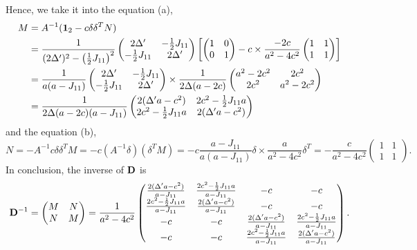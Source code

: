 \documentclass[a4paper]{book}
\newcounter{solution}[chapter]
\newcommand{\D}{{\bf D}}
\newcommand{\I}{{\bf 1}}
\begin{document}
\begin{solution}
\begin{itemize}
	Hence, we take it into the equation (a),
	\begin{align*}
		M &= A^{-1} ( \I_2 - c \delta \delta^T N) \\
		  &= \frac{1}{ (2\Delta^\prime)^2 - \left( \frac{1}{2} J_{11} \right)^2 } \begin{pmatrix}
		  	2\Delta^\prime & - \frac{1}{2} J_{11} \\ - \frac{1}{2} J_{11} & 2\Delta^\prime \end{pmatrix} \left[ \begin{pmatrix}
		  	1 & 0 \\ 0 & 1 
		 \end{pmatrix} - c \times \frac{ -2c }{ a^2 - 4c^2 } \begin{pmatrix} 1 & 1 \\ 1 & 1 	\end{pmatrix}  \right] \\
		 &= \frac{1}{ a ( a - J_{11} ) } \begin{pmatrix}
		  	2\Delta^\prime & - \frac{1}{2} J_{11} \\ - \frac{1}{2} J_{11} & 2\Delta^\prime \end{pmatrix} \times \frac{1}{ 2 \Delta ( a - 2c ) } \begin{pmatrix}
		a^2 - 2c^2 & 2c^2 \\ 2c^2 & a^2 - 2c^2 				  	
		  	\end{pmatrix} \\
		  &= \frac{1}{ 2\Delta (a-2c) (a-J_{11}) } \begin{pmatrix}
	2(\Delta^\prime a - c^2) & 2c^2 - \frac{1}{2} J_{11} a \\
	2c^2 - \frac{1}{2} J_{11} a & 2(\Delta^\prime a - c^2)
		  \end{pmatrix}
	\end{align*}
	and the equation (b),
	\[
		N = -A^{-1} c \delta \delta^T M = - c ( A^{-1} \delta ) (\delta^T M) = - c \frac{ a - J_{11} }{ a( a - J_{11} ) } \delta \times \frac{ a }{ a^2 - 4c^2 } \delta^T = - \frac{ c }{ a^2 - 4c^2 } \begin{pmatrix}
		  	 1 & 1 \\ 1 & 1
		  \end{pmatrix} .
	\]
	In conclusion, the inverse of $\D$ is
	\[
		\D^{-1} = \begin{pmatrix}
			M & N \\ N & M 
		\end{pmatrix} = \frac{ 1 }{ a^2 - 4c^2 } \begin{pmatrix}
			\frac{ 2(\Delta^\prime a - c^2) }{ a - J_{11} } & \frac{ 2c^2 - \frac{1}{2} J_{11} a }{ a - J_{11} } & -c & -c \\
			\frac{ 2c^2 - \frac{1}{2} J_{11} a }{ a - J_{11} } & \frac{ 2(\Delta^\prime a - c^2) }{ a - J_{11} } & -c & -c \\
			-c & -c & \frac{ 2(\Delta^\prime a - c^2) }{ a - J_{11} } & \frac{ 2c^2 - \frac{1}{2} J_{11} a }{ a - J_{11} } \\
			-c & -c & \frac{ 2c^2 - \frac{1}{2} J_{11} a }{ a - J_{11} } & \frac{ 2(\Delta^\prime a - c^2) }{ a - J_{11} }
		\end{pmatrix}.
	\]
	

\end{itemize}
\end{solution}
\end{document}
